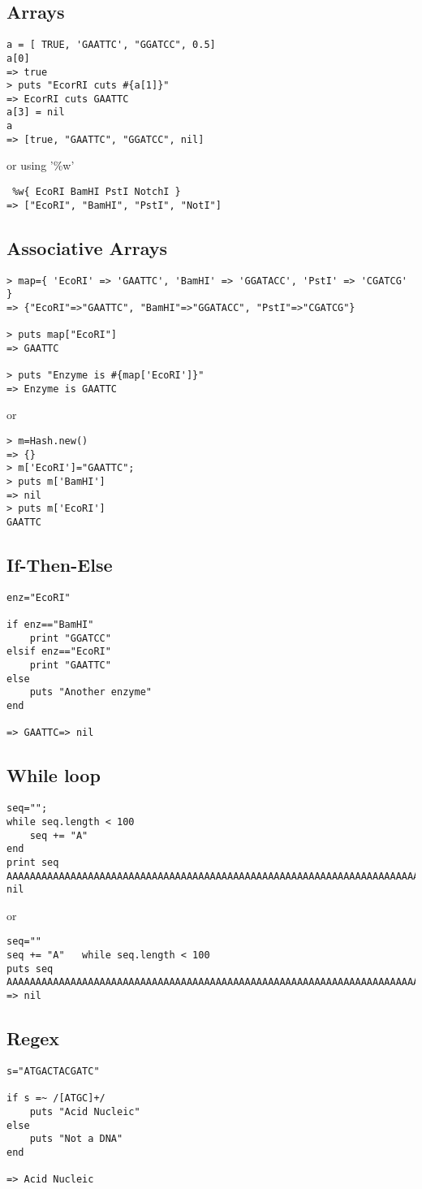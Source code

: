 \documentclass{article}
\begin{document}
\subsection{Arrays}

\begin{lstlisting}
a = [ TRUE, 'GAATTC', "GGATCC", 0.5]
a[0]
=> true
> puts "EcorRI cuts #{a[1]}"
=> EcorRI cuts GAATTC
a[3] = nil
a
=> [true, "GAATTC", "GGATCC", nil]
\end{lstlisting}

or using '\%w'
\begin{lstlisting}
 %w{ EcoRI BamHI PstI NotchI }
=> ["EcoRI", "BamHI", "PstI", "NotI"]
\end{lstlisting}

\subsection{Associative Arrays}
\begin{lstlisting}
> map={ 'EcoRI' => 'GAATTC', 'BamHI' => 'GGATACC', 'PstI' => 'CGATCG' }
=> {"EcoRI"=>"GAATTC", "BamHI"=>"GGATACC", "PstI"=>"CGATCG"}

> puts map["EcoRI"]
=> GAATTC

> puts "Enzyme is #{map['EcoRI']}"
=> Enzyme is GAATTC
\end{lstlisting}

or

\begin{lstlisting}
> m=Hash.new()
=> {}
> m['EcoRI']="GAATTC";
> puts m['BamHI']
=> nil
> puts m['EcoRI']
GAATTC
\end{lstlisting}


\subsection{If-Then-Else}
\begin{lstlisting}
enz="EcoRI"

if enz=="BamHI"
	print "GGATCC"
elsif enz=="EcoRI"
	print "GAATTC"
else
	puts "Another enzyme"
end

=> GAATTC=> nil
\end{lstlisting}

\subsection{While loop}
\begin{lstlisting}
seq="";
while seq.length < 100
	seq += "A"
end
print seq
AAAAAAAAAAAAAAAAAAAAAAAAAAAAAAAAAAAAAAAAAAAAAAAAAAAAAAAAAAAAAAAAAAAAAAAAAAAAAAAAAAAAAAAAAAAAAAAAAAAA=> nil
\end{lstlisting}
or
\begin{lstlisting}
seq=""
seq += "A"   while seq.length < 100
puts seq
AAAAAAAAAAAAAAAAAAAAAAAAAAAAAAAAAAAAAAAAAAAAAAAAAAAAAAAAAAAAAAAAAAAAAAAAAAAAAAAAAAAAAAAAAAAAAAAAAAAA
=> nil
\end{lstlisting}

\subsection{Regex}
\begin{lstlisting}
s="ATGACTACGATC"

if s =~ /[ATGC]+/
	puts "Acid Nucleic"
else
	puts "Not a DNA"
end

=> Acid Nucleic
\end{lstlisting}
\end{document}
